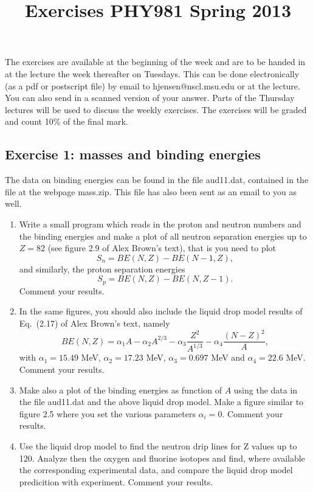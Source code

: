 \documentclass[prc]{revtex4}
\begin{document}
\title{Exercises PHY981 Spring 2013}
\maketitle
The exercises are available at the beginning of the 
week and are  to be handed in 
at the lecture the week thereafter on Tuesdays. This can be done electronically (as a pdf or postscript file) by email to 
hjensen@nscl.msu.edu or at the lecture. You can also send in a scanned version
of your answer. Parts of the Thursday lectures will be used to discuss the weekly exercises. The exercises will be graded and count 10\% of the final mark.
\subsection*{Exercise 1: masses and binding energies}
The data on binding energies can be found in the file aud11.dat, contained in the file at the webpage mass.zip. This file has also been sent as an email to you as well. 
\begin{enumerate}
\item Write a small program which reads in the proton and neutron numbers and the binding energies 
and make a plot of all neutron separation energies up to $Z=82$ (see figure 2.9 of Alex Brown's text), that is you need to plot
\[
S_n= BE(N,Z)-BE(N-1,Z),
\]
and similarly, the proton separation energies
\[
S_p=BE(N,Z)-BE(N,Z-1).
\]
Comment your results. 
\item In the same figures, you should also include the liquid drop model results of Eq.~(2.17) of Alex Brown's text, namely
\[
BE(N,Z)= \alpha_1A-\alpha_2A^{2/3}-\alpha_3\frac{Z^2}{A^{1/3}}-\alpha_4\frac{(N-Z)^2}{A},
\]
with $\alpha_1=15.49$ MeV, $\alpha_2=17.23$ MeV, $\alpha_3=0.697$ MeV and $\alpha_4=22.6$ MeV.
Comment your results. 
\item Make also a plot of the binding energies as function of $A$ using the data in the file aud11.dat and the above liquid drop model.  Make a figure similar to figure 2.5 where you set the various parameters $\alpha_i=0$. Comment your results. 
\item Use the liquid drop model to find the neutron drip lines   for Z values up to 120.
Analyze then the oxygen and fluorine isotopes and find, where available the corresponding experimental data, and compare the liquid drop model predicition with experiment. 
Comment your results.
\end{enumerate}
\end{document}
